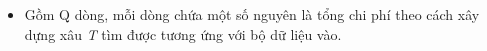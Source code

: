 \begin{itemize}
	\item Gồm Q dòng, mỗi dòng chứa một số nguyên là tổng chi phí theo cách xây dựng xâu \emph{ T } tìm được tương ứng với bộ dữ liệu vào.
\end{itemize}

\